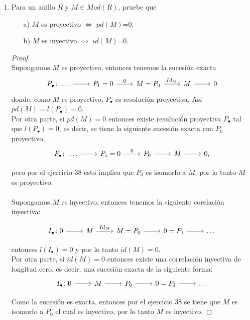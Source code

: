 \documentclass{article}
\begin{document}
\begin{enumerate}[label=\textbf{Ej \arabic*.}]
\item Para un anillo $R$ y $M\in Mod(R)$, pruebe que 
\begin{itemize}
\item[a)] $M$ es proyectivo $\iff$  $pd(M)$=0.
\item[b)] $M$ es inyectivo $\iff$  $id(M)$=0.
\end{itemize}
\begin{proof}
\\
Supongamos $M$ es proyectivo, entonces tenemos la sucesión exacta 
\[
\begin{tikzcd}
 P_\bullet \colon\,\ldots\arrow{r}{} & P_1=0 \arrow{r}{0}& M=P_0 \arrow{r}{Id_M} & M\arrow{r}{} &0
\end{tikzcd}
\]
donde, como $M$ es proyectivo, $P_\bullet$ es resolución proyectiva. Así \\ $pd(M)=l(P_\bullet)=0$.\\

Por otra parte, si $pd(M)=0$ entonces existe resulución proyectiva $P_\bullet$ tal que $l(P_\bullet)=0$, es decir, se tiene la siguiente 
sucesión exacta con $P_0$ proyectivo,
\[
\begin{tikzcd}
 P_\bullet \colon\,\ldots\arrow{r}{} & P_1=0 \arrow{r}{0}& P_0 \arrow{r}{} & M\arrow{r}{} &0,
\end{tikzcd}
\]

pero por el ejercicio 38 esto implica que $P_0$ es isomorfo a $M$, por lo tanto $M$ es proyectivo.\\
\\
Supongamos $M$ es inyectivo, entonces tenemos la siguiente corelación inyectiva:

\[
\begin{tikzcd}
 I_\bullet \colon 0\arrow{r}{} & M \arrow{r}{Id_M} & M=P_0\arrow{r}{} &0=P_1\arrow{r}{}&\ldots
\end{tikzcd}
\]

entonces $l( I_\bullet)=0$ y por lo tanto $id(M)=0.$\\

Por otra parte, si $id(M)=0$ entonces existe una correlación inyectiva de longitud cero, es decir, una sucesión exacta de la siguiente forma:
\[
\begin{tikzcd}
 I_\bullet \colon 0\arrow{r}{} & M \arrow{r}{} & P_0\arrow{r}{} &0=P_1\arrow{r}{}&\ldots
\end{tikzcd}
\]

Como la sucesión es exacta, entonces por el ejercicio 38 se tiene que $M$ es isomorfo a $P_0$ el cual es inyectivo, por lo tanto $M$ es inyectivo.
\end{proof}


\end{enumerate}
\end{document}
